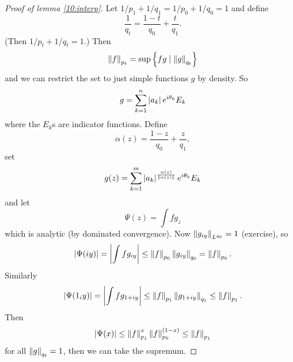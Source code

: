 \begin{proof}[Proof of lemma \ref{10:interp}]
  Let $1/p_1+1/q_1=1/p_0+1/q_0=1$ and define
  \[ \frac1{q_t}=\frac{1-t}{q_0}+\frac t{q_1}. \]
  (Then $1/p_t+1/q_t=1$.)
  Then
  \[ \left\lVert f \right\rVert_{p_t} = \sup\left\{ fg \mid \left\lVert g \right\rVert_{q_t} \right\} \]
  and we can restrict the set to just simple functions $g$ by density.
  So
  \[ g = \sum_{k=1}^n \left\lvert a_k \right\rvert e^{i\theta_k}E_k \]
  where the $E_k$s are indicator functions.
  Define
  \[ \alpha(z) = \frac{1-z}{q_0}+\frac z{q_1}, \]
  set
  \[ g(z) = \sum_{k=1}^m \left\lvert a_k \right\rvert^\frac{\alpha(z)}{\left\lVert \alpha(z) \right\rVert}e^{i\theta_k}E_k\]
  and let
  \[ \Psi(z) = \int fg_z \]
  which is analytic (by dominated convergence).
  Now $\left\lVert g_{iy} \right\rVert_{L^{q_0}}=1$ (exercise), so
  \[ \left\lvert \Psi(iy) \right\rvert = \left\lvert \int fg_{iy} \right\rvert \leq \left\lVert f \right\rVert_{p_0}\left\lVert g_{iy} \right\rVert_{q_0}=\left\lVert f \right\rVert_{p_0}. \]
  Similarly
  \[ \left\lvert \Psi(1_iy) \right\rvert=\left\lvert \int fg_{1+iy} \right\rvert\leq\left\lVert f \right\rVert_{p_1}{\left\lVert g_{1+iy} \right\rVert_{q_1}}\leq\left\lVert f \right\rVert_{p_1}. \]
  Then
  \[ \left\lvert \Psi(x) \right\rvert \leq \left\lVert f \right\rVert_{p_1}^x \left\lVert f \right\rVert_{p_0}^{(1-x)} \leq \left\lVert f \right\rVert_{p_1} \]
  for all $\left\lVert g \right\rVert_{q_t}=1$, then we can take the supremum.
\end{proof}
